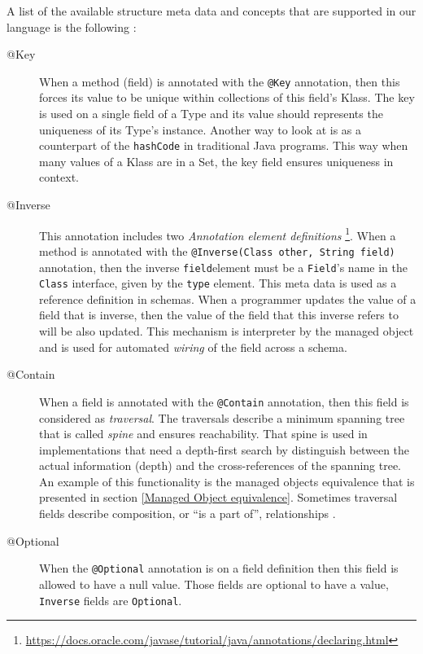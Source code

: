 A list of the available structure meta data and concepts that are supported in our language is the following \cite{loh2012managed}:
\begin{description}
	\item [@Key] When a method (field) is annotated with the \texttt{@Key} annotation, then this forces its value to be unique within collections of this field's Klass.
	The key is used on a single field of a Type and its value should represents the uniqueness of its Type's instance.
	Another way to look at is as a counterpart of the \texttt{hashCode} in traditional Java programs.
	This way when many values of a Klass are in a Set, the key field ensures uniqueness in context.

	\item [@Inverse] This annotation includes two \textit{Annotation element definitions} \footnote{
		\url{https://docs.oracle.com/javase/tutorial/java/annotations/declaring.html}}.
	When a method is annotated with the \texttt{@Inverse(Class other, String field)} annotation, then the inverse \texttt{field}element must be a \texttt{Field}'s name in the \texttt{Class} interface, given by the \texttt{type} element.
	This meta data is used as a reference definition in schemas.
	When a programmer updates the value of a field that is inverse, then the value of the field that this inverse refers to will be also updated.
	This mechanism is interpreter by the managed object and is used for automated \textit{wiring} of the field across a schema.

	\item [@Contain] When a field is annotated with the \texttt{@Contain} annotation, then this field is considered as \textit{traversal}. 
	The traversals describe a minimum spanning tree that is called \textit{spine} and ensures reachability.
	That spine is used in implementations that need a depth-first search by distinguish between the actual information (depth) and the cross-references of the spanning tree.
	An example of this functionality is the managed objects equivalence that is presented in section \ref{Managed Object equivalence}.
	Sometimes traversal fields describe composition, or ``is a part of'', relationships \cite{loh2012managed}.

	\item [@Optional] When the \texttt{@Optional} annotation is on a field definition then this field is allowed to have a null value.
	Those fields are optional to have a value, \texttt{Inverse} fields are \texttt{Optional}. 


\end{description}
